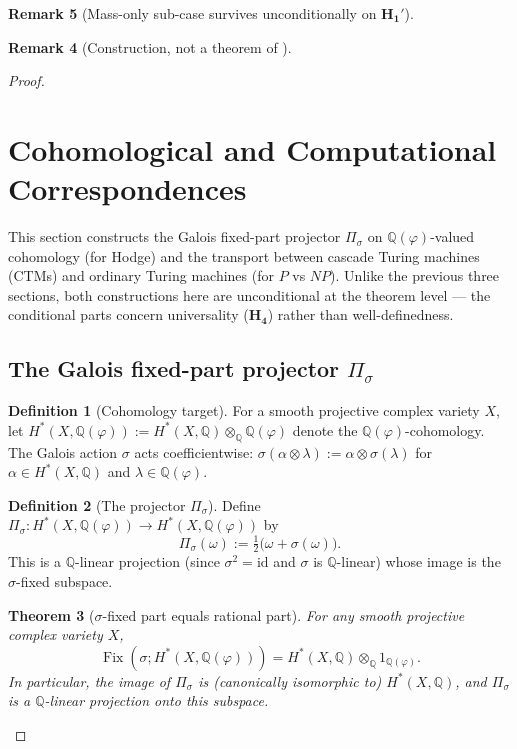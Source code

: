 \documentclass[11pt, a4paper]{amsart}
\newtheorem{theorem}{Theorem}[section]
\theoremstyle{definition}
\newtheorem{definition}[theorem]{Definition}
\newtheorem{remark}[theorem]{Remark}
\newcommand{\Q}{\mathbb{Q}}
\newcommand{\pphi}{\varphi}
\newcommand{\Fix}{\operatorname{Fix}}
\begin{document}
\begin{remark}[Mass-only sub-case survives unconditionally on $\mathbf{H_1'}$]
\begin{remark}[Construction, not a theorem of \cite{CascadeEmbeddings}]
\begin{proof}
\section{Cohomological and Computational Correspondences}
\label{sec:cohomology-comp}

This section constructs the Galois fixed-part projector
$\Pi_\sigma$ on $\Q(\pphi)$-valued cohomology (for Hodge) and the
transport between cascade Turing machines (CTMs) and ordinary
Turing machines (for $P$ vs $NP$). Unlike the previous three
sections, both constructions here are unconditional at the
theorem level --- the conditional parts concern universality
($\mathbf{H_4}$) rather than well-definedness.

\subsection{The Galois fixed-part projector $\Pi_\sigma$}
\label{subsec:pisigma}

\begin{definition}[Cohomology target]
\label{def:coh-target}
For a smooth projective complex variety $X$, let
$H^*(X, \Q(\pphi)) := H^*(X, \Q) \otimes_\Q \Q(\pphi)$ denote the
$\Q(\pphi)$-cohomology. The Galois action $\sigma$ acts coefficientwise:
$\sigma(\alpha \otimes \lambda) := \alpha \otimes \sigma(\lambda)$
for $\alpha \in H^*(X, \Q)$ and $\lambda \in \Q(\pphi)$.
\end{definition}

\begin{definition}[The projector $\Pi_\sigma$]
\label{def:pisigma}
Define
$\Pi_\sigma \colon H^*(X, \Q(\pphi)) \to H^*(X, \Q(\pphi))$ by
\[
  \Pi_\sigma(\omega) := \tfrac{1}{2} \big( \omega + \sigma(\omega)
  \big).
\]
This is a $\Q$-linear projection (since $\sigma^2 = \mathrm{id}$
and $\sigma$ is $\Q$-linear) whose image is the $\sigma$-fixed
subspace.
\end{definition}

\begin{theorem}[$\sigma$-fixed part equals rational part]
\label{thm:fix-sigma-rational}
For any smooth projective complex variety $X$,
\[
  \Fix(\sigma; H^*(X, \Q(\pphi))) = H^*(X, \Q) \otimes_\Q 1_{\Q(\pphi)}.
\]
In particular, the image of $\Pi_\sigma$ is (canonically isomorphic
to) $H^*(X, \Q)$, and $\Pi_\sigma$ is a $\Q$-linear projection onto
this subspace.
\end{theorem}


\end{proof}
\end{remark}
\end{remark}
\end{document}

